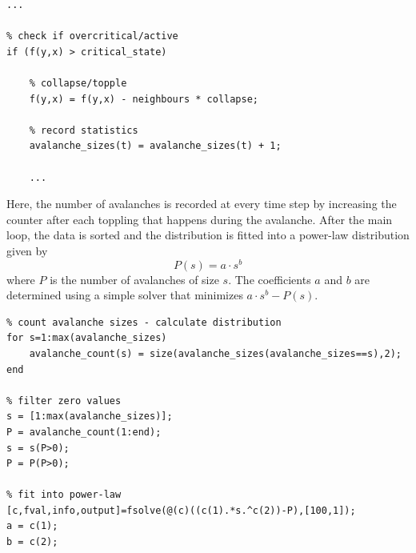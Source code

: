 \begin{lstlisting}
...

% check if overcritical/active
if (f(y,x) > critical_state)

	% collapse/topple
	f(y,x) = f(y,x) - neighbours * collapse;

	% record statistics
	avalanche_sizes(t) = avalanche_sizes(t) + 1;

	...
\end{lstlisting}

Here, the number of avalanches is recorded at every time step by increasing the counter after each toppling that happens during the avalanche. After the main loop, the data is sorted and the distribution is fitted into a power-law distribution given by
\[
P(s) = a \cdot s^b
\]
where $P$ is the number of avalanches of size $s$. The coefficients $a$ and $b$ are determined using a simple solver that minimizes $a \cdot s^b-P(s)$.

\begin{lstlisting}
% count avalanche sizes - calculate distribution
for s=1:max(avalanche_sizes)
	avalanche_count(s) = size(avalanche_sizes(avalanche_sizes==s),2);
end

% filter zero values
s = [1:max(avalanche_sizes)];
P = avalanche_count(1:end);
s = s(P>0);
P = P(P>0);

% fit into power-law
[c,fval,info,output]=fsolve(@(c)((c(1).*s.^c(2))-P),[100,1]);
a = c(1);
b = c(2);

\end{lstlisting}

